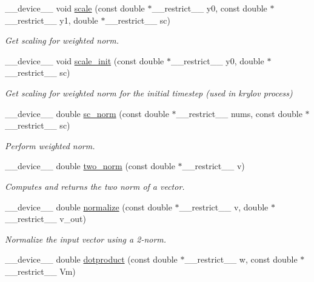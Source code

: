 \begin{DoxyCompactItemize}
\+\_\+\+\_\+device\+\_\+\+\_\+ void \hyperlink{exponential__linear__algebra_8cu_ace23ed149f65a9b90469b38ecd9ef01b}{scale} (const double $\ast$\+\_\+\+\_\+restrict\+\_\+\+\_\+ y0, const double $\ast$\+\_\+\+\_\+restrict\+\_\+\+\_\+ y1, double $\ast$\+\_\+\+\_\+restrict\+\_\+\+\_\+ sc)
\begin{DoxyCompactList}\small\item\em Get scaling for weighted norm. \end{DoxyCompactList}\item 
\+\_\+\+\_\+device\+\_\+\+\_\+ void \hyperlink{exponential__linear__algebra_8cu_a2e7ea5b129b2e703fcc6aeb3affadd64}{scale\+\_\+init} (const double $\ast$\+\_\+\+\_\+restrict\+\_\+\+\_\+ y0, double $\ast$\+\_\+\+\_\+restrict\+\_\+\+\_\+ sc)
\begin{DoxyCompactList}\small\item\em Get scaling for weighted norm for the initial timestep (used in krylov process) \end{DoxyCompactList}\item 
\+\_\+\+\_\+device\+\_\+\+\_\+ double \hyperlink{exponential__linear__algebra_8cu_a0c015672153032287ee1abbde6487d41}{sc\+\_\+norm} (const double $\ast$\+\_\+\+\_\+restrict\+\_\+\+\_\+ nums, const double $\ast$\+\_\+\+\_\+restrict\+\_\+\+\_\+ sc)
\begin{DoxyCompactList}\small\item\em Perform weighted norm. \end{DoxyCompactList}\item 
\+\_\+\+\_\+device\+\_\+\+\_\+ double \hyperlink{exponential__linear__algebra_8cu_aa0074f06fcc396f12514f858ab825ca8}{two\+\_\+norm} (const double $\ast$\+\_\+\+\_\+restrict\+\_\+\+\_\+ v)
\begin{DoxyCompactList}\small\item\em Computes and returns the two norm of a vector. \end{DoxyCompactList}\item 
\+\_\+\+\_\+device\+\_\+\+\_\+ double \hyperlink{exponential__linear__algebra_8cu_ae01ed1392756734c2d6996554cb20176}{normalize} (const double $\ast$\+\_\+\+\_\+restrict\+\_\+\+\_\+ v, double $\ast$\+\_\+\+\_\+restrict\+\_\+\+\_\+ v\+\_\+out)
\begin{DoxyCompactList}\small\item\em Normalize the input vector using a 2-\/norm. \end{DoxyCompactList}\item 
\+\_\+\+\_\+device\+\_\+\+\_\+ double \hyperlink{exponential__linear__algebra_8cu_a43b8d535f44e58015de9b6ea37561bd7}{dotproduct} (const double $\ast$\+\_\+\+\_\+restrict\+\_\+\+\_\+ w, const double $\ast$\+\_\+\+\_\+restrict\+\_\+\+\_\+ Vm)

\end{DoxyCompactItemize}
